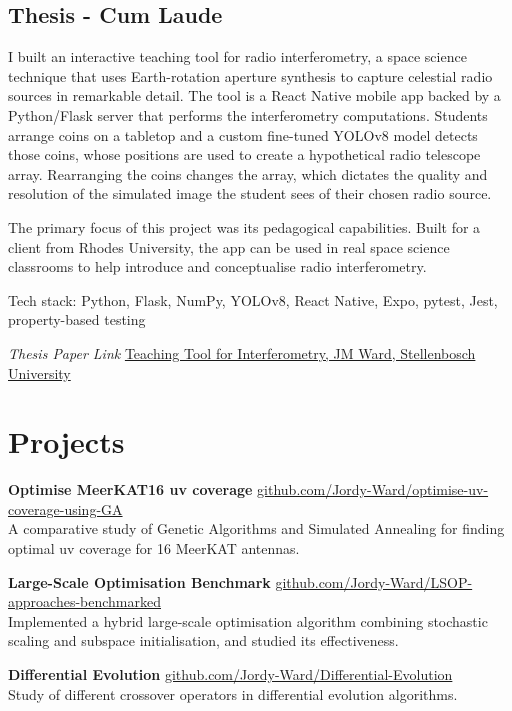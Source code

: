 \documentclass[11pt, a4paper]{article}
\begin{document}
\subsection*{Thesis - Cum Laude}
I built an interactive teaching tool for radio interferometry, a space science technique that  uses Earth-rotation aperture synthesis to capture celestial radio sources in remarkable detail. The tool is a React Native mobile app backed by a Python/Flask server that performs the interferometry computations. Students arrange coins on a tabletop and a custom fine-tuned YOLOv8 model detects those coins, whose positions are used to create a hypothetical radio telescope array. Rearranging the coins changes the array, which dictates the quality and resolution of the simulated image the student sees of their chosen radio source.

The primary focus of this project was its pedagogical capabilities. Built for a client from Rhodes University, the app can be used in real space science classrooms to help introduce and conceptualise radio interferometry.

Tech stack: Python, Flask, NumPy, YOLOv8, React Native, Expo, pytest, Jest, property-based testing

\textit{Thesis Paper Link} \newline
\href{https://jmw-industries.vercel.app/Teaching_Tool_Interferometry_JMWard_Honours_Thesis.pdf}{Teaching Tool for Interferometry, JM Ward, Stellenbosch University}

\section{Projects}
\textbf{Optimise MeerKAT16 uv coverage} \hfill \href{https://github.com/Jordy-Ward/optimise-uv-coverage-using-GA}{github.com/Jordy-Ward/optimise-uv-coverage-using-GA} \\
A comparative study of Genetic Algorithms and Simulated Annealing for finding optimal uv coverage for 16 MeerKAT antennas.

\textbf{Large-Scale Optimisation Benchmark} \hfill \href{https://github.com/Jordy-Ward/LSOP-approaches-benchmarked}{github.com/Jordy-Ward/LSOP-approaches-benchmarked} \\
Implemented a hybrid large-scale optimisation algorithm combining stochastic scaling and subspace initialisation, and studied its effectiveness.

\textbf{Differential Evolution} \hfill \href{https://github.com/Jordy-Ward/Differential-Evolution}{github.com/Jordy-Ward/Differential-Evolution} \\
Study of different crossover operators in differential evolution algorithms.
\end{document}
